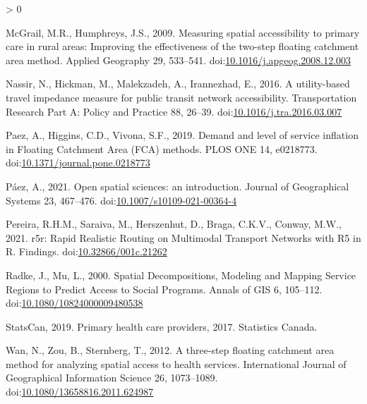 \documentclass[]{elsarticle} %
\newlength{\cslhangindent}
\newenvironment{CSLReferences}[2] %
 {%
  \setlength{\parindent}{0pt}
  \ifodd #1 \everypar{\setlength{\hangindent}{\cslhangindent}}\ignorespaces\fi
  \ifnum #2 > 0
  \setlength{\parskip}{#2\baselineskip}
  \fi
 }%
 {}
\begin{document}
\begin{CSLReferences}{1}{0}
\leavevmode\hypertarget{ref-mcgrail2009}{}%
McGrail, M.R., Humphreys, J.S., 2009. Measuring spatial accessibility to
primary care in rural areas: Improving the effectiveness of the two-step
floating catchment area method. Applied Geography 29, 533--541.
doi:\href{https://doi.org/10.1016/j.apgeog.2008.12.003}{10.1016/j.apgeog.2008.12.003}

\leavevmode\hypertarget{ref-nassir2016}{}%
Nassir, N., Hickman, M., Malekzadeh, A., Irannezhad, E., 2016. A
utility-based travel impedance measure for public transit network
accessibility. Transportation Research Part A: Policy and Practice 88,
26--39.
doi:\href{https://doi.org/10.1016/j.tra.2016.03.007}{10.1016/j.tra.2016.03.007}

\leavevmode\hypertarget{ref-paez2019}{}%
Paez, A., Higgins, C.D., Vivona, S.F., 2019. Demand and level of service
inflation in Floating Catchment Area (FCA) methods. PLOS ONE 14,
e0218773.
doi:\href{https://doi.org/10.1371/journal.pone.0218773}{10.1371/journal.pone.0218773}

\leavevmode\hypertarget{ref-paez2021}{}%
Páez, A., 2021. Open spatial sciences: an introduction. Journal of
Geographical Systems 23, 467--476.
doi:\href{https://doi.org/10.1007/s10109-021-00364-4}{10.1007/s10109-021-00364-4}

\leavevmode\hypertarget{ref-pereira2021}{}%
Pereira, R.H.M., Saraiva, M., Herszenhut, D., Braga, C.K.V., Conway,
M.W., 2021. r5r: Rapid Realistic Routing on Multimodal Transport
Networks with R5 in R. Findings.
doi:\href{https://doi.org/10.32866/001c.21262}{10.32866/001c.21262}

\leavevmode\hypertarget{ref-radke2000}{}%
Radke, J., Mu, L., 2000. Spatial Decompositions, Modeling and Mapping
Service Regions to Predict Access to Social Programs. Annals of GIS 6,
105--112.
doi:\href{https://doi.org/10.1080/10824000009480538}{10.1080/10824000009480538}

\leavevmode\hypertarget{ref-statcan2019}{}%
StatsCan, 2019. Primary health care providers, 2017. Statistics Canada.

\leavevmode\hypertarget{ref-wan2012}{}%
Wan, N., Zou, B., Sternberg, T., 2012. A three-step floating catchment
area method for analyzing spatial access to health services.
International Journal of Geographical Information Science 26,
1073--1089.
doi:\href{https://doi.org/10.1080/13658816.2011.624987}{10.1080/13658816.2011.624987}

\end{CSLReferences}
\end{document}
